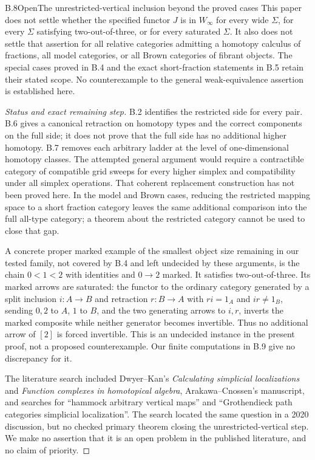 \begin{result}{B.8}{Open}{The unrestricted-vertical inclusion beyond the proved cases}
This paper does not settle whether the specified functor $J$ is in $W_\infty$ for every wide $\Sigma$, for every $\Sigma$ satisfying two-out-of-three, or for every saturated $\Sigma$. It also does not settle that assertion for all relative categories admitting a homotopy calculus of fractions, all model categories, or all Brown categories of fibrant objects. The special cases proved in B.4 and the exact short-fraction statements in B.5 retain their stated scope. No counterexample to the general weak-equivalence assertion is established here.
\end{result}
\begin{proof}[Status and exact remaining step]
B.2 identifies the restricted side for every pair. B.6 gives a canonical retraction on homotopy types and the correct components on the full side; it does not prove that the full side has no additional higher homotopy. B.7 removes each arbitrary ladder at the level of one-dimensional homotopy classes. The attempted general argument would require a contractible category of compatible grid sweeps for every higher simplex and compatibility under all simplex operations. That coherent replacement construction has not been proved here. In the model and Brown cases, reducing the restricted mapping space to a short fraction category leaves the same additional comparison into the full all-type category; a theorem about the restricted category cannot be used to close that gap.

A concrete proper marked example of the smallest object size remaining in our tested family, not covered by B.4 and left undecided by these arguments, is the chain $0<1<2$ with identities and $0\to2$ marked. It satisfies two-out-of-three. Its marked arrows are saturated: the functor to the ordinary category generated by a split inclusion $i:A\to B$ and retraction $r:B\to A$ with $ri=1_A$ and $ir\ne1_B$, sending $0,2$ to $A$, $1$ to $B$, and the two generating arrows to $i,r$, inverts the marked composite while neither generator becomes invertible. Thus no additional arrow of $[2]$ is forced invertible. This is an undecided instance in the present proof, not a proposed counterexample. Our finite computations in B.9 give no discrepancy for it.

The literature search included Dwyer--Kan's \emph{Calculating simplicial localizations} and \emph{Function complexes in homotopical algebra}, Arakawa--Cnossen's manuscript, and searches for ``hammock arbitrary vertical maps'' and ``Grothendieck path categories simplicial localization''. The search located the same question in a 2020 discussion, but no checked primary theorem closing the unrestricted-vertical step. We make no assertion that it is an open problem in the published literature, and no claim of priority.
\end{proof}


